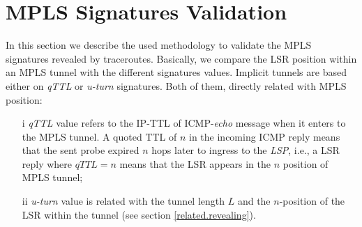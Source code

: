 \section{MPLS Signatures Validation}\label{validation}

In this section we describe the used methodology to validate the MPLS signatures
revealed by traceroutes. Basically, we compare the LSR position within an MPLS tunnel with the different signatures values.
Implicit tunnels are based either on \textit{qTTL} or \textit{u-turn} signatures. Both of
them, directly related with MPLS position:

\begin{itemize}
  \item[i] \textit{qTTL} value refers to the IP-TTL of ICMP-\textit{echo}
  message when it enters to the MPLS  tunnel. A quoted TTL of $n$ in
  the incoming ICMP reply means that the sent probe
  expired $n$ hops later to ingress to the \textit{LSP}, i.e., a LSR reply where $\textit{qTTL}=n$ means that the LSR appears  in the $n$ position of MPLS tunnel;
  \item[ii] \textit{u-turn} value is related with the tunnel length $L$ and the $n$-position of the LSR within the tunnel (see section \ref{related.revealing}).
\end{itemize}



